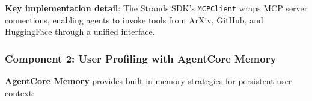 \begin{Shaded}
\begin{Highlighting}[]
         

         

\OperatorTok{=}
\NormalTok{,}
\OperatorTok{=}
\NormalTok{        )}
\end{Highlighting}
\end{Shaded}

\textbf{Key implementation detail}: The Strands SDK's \texttt{MCPClient}
wraps MCP server connections, enabling agents to invoke tools from
ArXiv, GitHub, and HuggingFace through a unified interface.

\subsubsection{Component 2: User Profiling with AgentCore
Memory}\label{component-2-user-profiling-with-agentcore-memory}

\textbf{AgentCore Memory} provides built-in memory strategies for
persistent user context:

